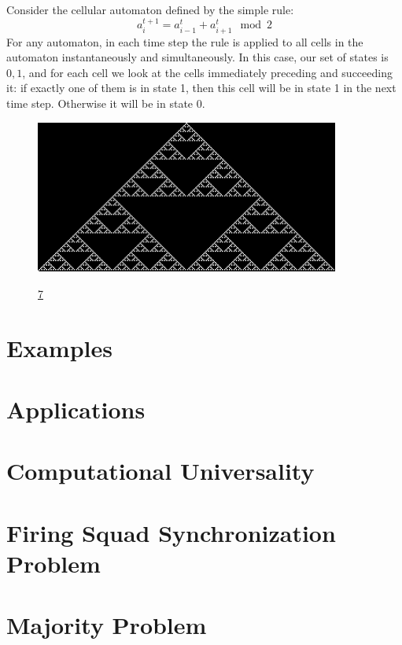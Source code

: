 \documentclass[11pt,a4paper]{article}
\begin{document}
    Consider the cellular automaton defined by the simple rule:
    $$ a_{i}^{t+1} = a_{i-1}^{t} + a_{i+1}^{t} \mod{2} $$
    For any automaton, in each time step the rule is applied to all cells in the
    automaton instantaneously and simultaneously. In this case, our set of
    states is ${0,1}$, and for each cell we look at the cells immediately
    preceding and succeeding it: if exactly one of them is in state 1, then this
    cell will be in state 1 in the next time step. Otherwise it will be in state
    0.
    \begin{figure}[h]
        \begin{center}
            \includegraphics[width=10cm]{rule1.png}
            \caption{}
            \ref{}
        \end{center}
    \end{figure}
\section{}
\section{Examples}
\section{Applications}
\section{Computational Universality}
\section{Firing Squad Synchronization Problem}
\section{Majority Problem}
\section{}
\end{document}
